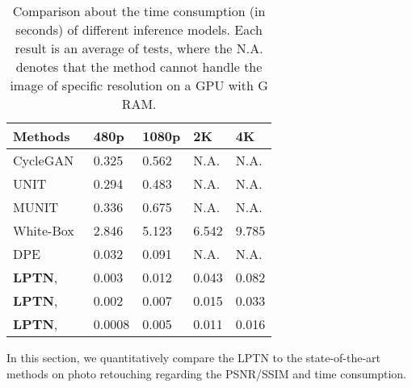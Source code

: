 \documentclass[10pt,twocolumn,letterpaper]{article}
\begin{document}
	\begin{table}[t]
		\caption{Comparison about the time consumption (in seconds) of different inference models. Each result is an average of  tests, where the N.A. denotes that the method cannot handle the image of specific resolution on a GPU with G RAM.
		}
		\vspace{-1.2em}
		\small
		\label{time_comparison}
		\begin{center}
			\begin{tabular}{p{2.3cm}p{1cm}<{\centering}p{1cm}<{\centering}p{1cm}<{\centering}p{1cm}<{\centering}}
				\toprule
				Methods&480p&1080p&2K&4K\\
				\midrule
				CycleGAN~\cite{zhu2017unpaired}  &0.325&0.562&N.A.&N.A. \\
				UNIT~\cite{liu2017unsupervised} &0.294&0.483&N.A.&N.A. \\
				MUNIT~\cite{huang2018multimodal} &0.336&0.675&N.A.&N.A. \\
				White-Box~\cite{hu2018exposure} &2.846&5.123&6.542&9.785 \\
				DPE \cite{chen2018deep}&0.032&0.091&N.A.&N.A. \\
				\midrule
				\textbf{LPTN},  &0.003&0.012&0.043&0.082 \\
				\textbf{LPTN},  &0.002&0.007&0.015&0.033 \\
				\textbf{LPTN},  &0.0008&0.005&0.011&0.016 \\
				\bottomrule
			\end{tabular}
		\end{center}
	\end{table}
	
		
	In this section, we quantitatively compare the LPTN to the state-of-the-art methods on photo retouching regarding the PSNR/SSIM and time consumption.
	
\end{document}
